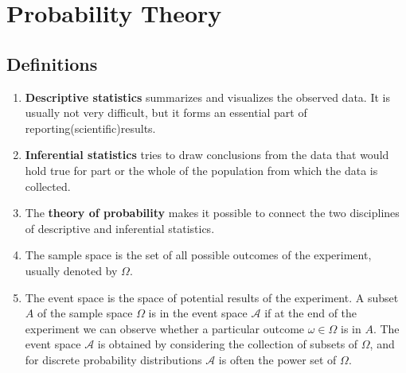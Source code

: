 \chapter{Probability Theory}

\section{Definitions}

\begin{enumerate}
    \item \textbf{Descriptive statistics} summarizes and visualizes the observed data. It is usually not very difficult, but it forms an essential part of reporting(scientific)results.
    \hfill \cite{statistics/book/Statistics-for-Data-Scientists/Maurits-Kaptein}

    \item \textbf{Inferential statistics} tries to draw conclusions from the data that would hold true for part or the whole of the population from which the data is collected.
    \hfill \cite{statistics/book/Statistics-for-Data-Scientists/Maurits-Kaptein}

    \item The \textbf{theory of probability} makes it possible to connect the two disciplines of descriptive and inferential statistics.
    \hfill \cite{statistics/book/Statistics-for-Data-Scientists/Maurits-Kaptein}

    \item
    \begin{definition}
        The sample space is the set of all possible outcomes of the experiment, usually denoted by $\Omega$.
        \hfill \cite{mfml/book/mml/Deisenroth-Faisal-Ong}
    \end{definition}

    \item
    \begin{definition}
        The event space is the space of potential results of the experiment.
        A subset $A$ of the sample space $\Omega$ is in the event space $\mathcal{A}$ if at the end of the experiment we can observe whether a particular outcome $\omega \in \Omega$ is in $A$.
        The event space $\mathcal{A}$ is obtained by considering the collection of subsets of $\Omega$, and for discrete probability distributions $\mathcal{A}$ is often the power set of $\Omega$.
        \hfill \cite{mfml/book/mml/Deisenroth-Faisal-Ong}
    \end{definition}


\end{enumerate}
